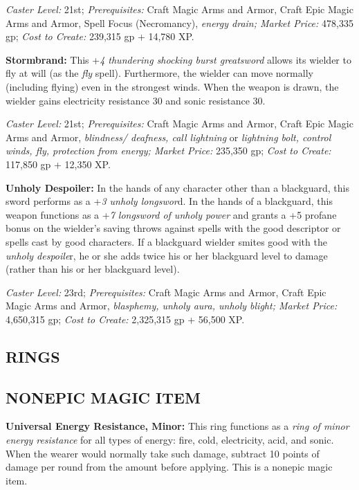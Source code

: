 \documentclass{article}
\begin{document}
\textit{Caster Level: }21st; \textit{Prerequisites: }Craft Magic Arms and Armor, 
Craft Epic Magic Arms and Armor, Spell Focus (Necromancy), \textit{energy drain; 
Market Price: }478,335 gp; \textit{Cost to Create: }239,315 gp + 14,780 XP. 

\textbf{Stormbrand: }This +\textit{4 thundering shocking burst greatsword }allows 
its wielder to fly at will (as the \textit{fly }spell). Furthermore, the wielder 
can move normally (including flying) even in the strongest winds. When the weapon 
is drawn, the wielder gains electricity resistance 30 and sonic resistance 30. 

\textit{Caster Level: }21st; \textit{Prerequisites: }Craft Magic Arms and Armor, 
Craft Epic Magic Arms and Armor, \textit{blindness/ deafness, call lightning }or 
\textit{lightning bolt, control winds, fly, protection from energy; Market Price: 
}235,350 gp; \textit{Cost to Create: }117,850 gp + 12,350 XP. 

\textbf{Unholy Despoiler: }In the hands of any character other than a blackguard, 
this sword performs as a +\textit{3 unholy longswor}d. In the hands of a blackguard, 
this weapon functions as a +\textit{7 longsword of unholy power }and grants a +5 
profane bonus on the wielder's saving throws against spells with the good descriptor 
or spells cast by good characters. If a blackguard wielder smites good with the 
\textit{unholy despoile}r, he or she adds twice his or her blackguard level to 
damage (rather than his or her blackguard level). 

\textit{Caster Level: }23rd; \textit{Prerequisites: }Craft Magic Arms and Armor, 
Craft Epic Magic Arms and Armor, \textit{blasphemy, unholy aura, unholy blight; 
Market Price: }4,650,315 gp; \textit{Cost to Create: }2,325,315 gp + 56,500 XP. 

\vspace{24pt}
\subsection*{{\LARGE{}RINGS }}

\vspace{12pt}
\subsection*{NONEPIC MAGIC ITEM }

\textbf{Universal Energy Resistance, Minor: }This ring functions as a \textit{ring 
of minor energy resistance }for all types of energy: fire, cold, electricity, acid, 
and sonic. When the wearer would normally take such damage, subtract 10 points 
of damage per round from the amount before applying. This is a nonepic magic item. 
\end{document}
